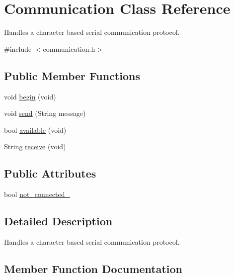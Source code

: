 \hypertarget{class_communication}{}\section{Communication Class Reference}
\label{class_communication}


Handles a character based serial communication protocol.  




{\ttfamily \#include $<$communication.\+h$>$}

\subsection*{Public Member Functions}
\begin{DoxyCompactItemize}
\item 
void \hyperlink{class_communication_af7eea76d811d38b02fb67ec5133e6eec}{begin} (void)
\item 
void \hyperlink{class_communication_a7905fe8302c11cc1c1dc8a10bc71fdc6}{send} (String message)
\item 
bool \hyperlink{class_communication_a086f2246c7e3715c8de1bc96cfbce262}{available} (void)
\item 
String \hyperlink{class_communication_ad53d6b2efc619612fb542afdfda43ec0}{receive} (void)
\end{DoxyCompactItemize}
\subsection*{Public Attributes}
\begin{DoxyCompactItemize}
\item 
bool \hyperlink{class_communication_a566d648baea3543f997db397e7467a75}{not\+\_\+connected\+\_\+}
\end{DoxyCompactItemize}


\subsection{Detailed Description}
Handles a character based serial communication protocol. 

\subsection{Member Function Documentation}
\hypertarget{class_communication_a086f2246c7e3715c8de1bc96cfbce262}{}
